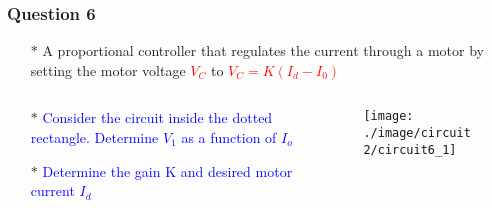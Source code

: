 \documentclass{beamer}
\newcommand{\blue}[1]{\textcolor{blue}{#1}}
\newcommand{\red}[1]{\textcolor{red}{#1}}
\begin{document}
\begin{frame}
\frametitle{Question 6}

\begin{itemize} \itemsep1pt \parskip0pt 
  \item[$\ast$] A proportional controller that regulates the
current through a motor by setting the motor
voltage \red{$V_C$} to \red{$V_C = K(I_d - I_0)$}
\end{itemize}


\begin{columns}

\begin{column}{4cm}
\begin{itemize} \itemsep1pt \parskip0pt 
  \item[$\ast$] \blue{Consider the circuit inside the dotted rectangle. Determine $V_1$ as a function of $I_o$}
  \item[$\ast$] \blue{Determine the gain K and desired motor current $I_d$}
\end{itemize}
\end{column}


\begin{column}{8cm}
\begin{figure}[H]
  \centering
  \texttt{[image: ./image/circuit2/circuit6\_1]}
\end{figure}
\end{column}

\end{columns}

\end{frame}

\end{document}
